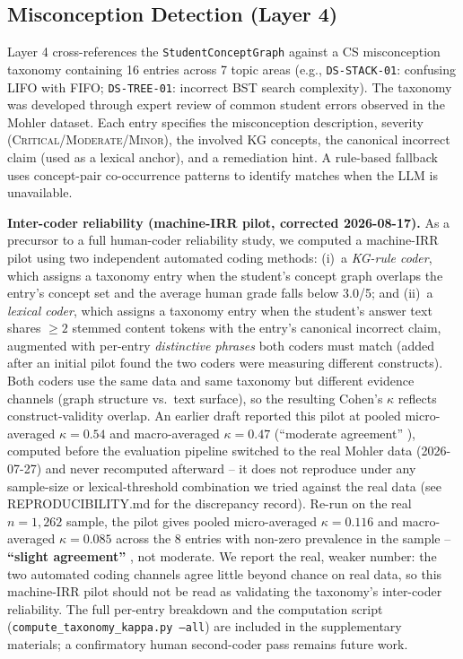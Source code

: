 \documentclass[conference]{IEEEtran}
\begin{document}
\subsection{Misconception Detection (Layer 4)}

Layer 4 cross-references the \texttt{StudentConceptGraph} against a
CS misconception taxonomy containing 16 entries across 7 topic areas
(e.g., \texttt{DS-STACK-01}: confusing LIFO with FIFO;
\texttt{DS-TREE-01}: incorrect BST search complexity).
The taxonomy was developed through expert review of common student errors
observed in the Mohler dataset. Each entry specifies the misconception
description, severity (\textsc{Critical}/\textsc{Moderate}/\textsc{Minor}), the
involved KG concepts, the canonical incorrect claim (used as a lexical anchor),
and a remediation hint. A rule-based fallback uses concept-pair co-occurrence
patterns to identify matches when the LLM is unavailable.

\textbf{Inter-coder reliability (machine-IRR pilot, corrected 2026-08-17).}
As a precursor to a full human-coder reliability study, we computed a
machine-IRR pilot using two independent automated coding methods: (i)~a
\emph{KG-rule coder}, which assigns a taxonomy entry when the student's concept
graph overlaps the entry's concept set and the average human grade falls below
3.0/5; and (ii)~a \emph{lexical coder}, which assigns a taxonomy entry when the
student's answer text shares $\geq 2$ stemmed content tokens with the entry's
canonical incorrect claim, augmented with per-entry \emph{distinctive phrases}
both coders must match (added after an initial pilot found the two coders were
measuring different constructs). Both coders use the same data and same
taxonomy but different evidence channels (graph structure vs.\ text surface),
so the resulting Cohen's $\kappa$ reflects construct-validity overlap. An
earlier draft reported this pilot at pooled micro-averaged $\kappa = 0.54$
and macro-averaged $\kappa = 0.47$ (``moderate agreement''
\cite{Landis1977}), computed before the evaluation pipeline switched to the
real Mohler data (2026-07-27) and never recomputed afterward -- it does not
reproduce under any sample-size or lexical-threshold combination we tried
against the real data (see REPRODUCIBILITY.md for the discrepancy record).
Re-run on the real $n=1{,}262$ sample, the pilot gives pooled
micro-averaged $\kappa = 0.116$ and macro-averaged $\kappa = 0.085$ across
the 8 entries with non-zero prevalence in the sample -- \textbf{``slight
agreement''} \cite{Landis1977}, not moderate. We report the real, weaker
number: the two automated coding channels agree little beyond chance on
real data, so this machine-IRR pilot should not be read as validating the
taxonomy's inter-coder reliability. The full per-entry breakdown and the
computation script (\texttt{compute\_taxonomy\_kappa.py --all}) are
included in the supplementary materials; a confirmatory human second-coder
pass remains future work.
\end{document}
